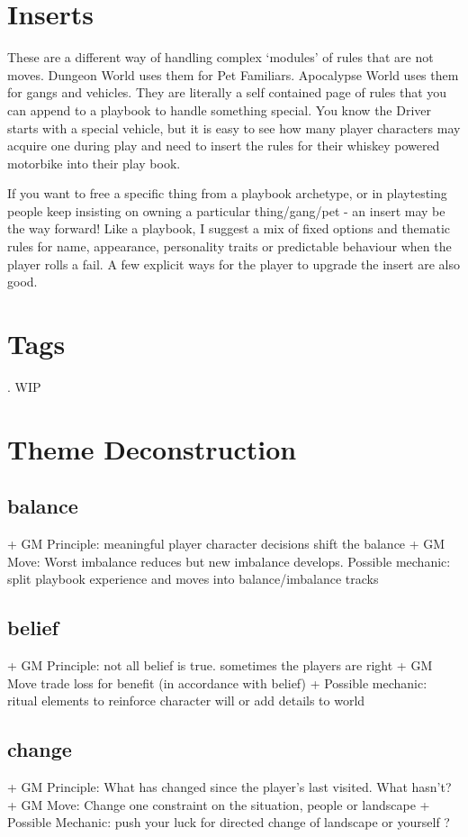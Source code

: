\documentclass{tufte-handout}
\begin{document}
\section{Inserts}
These are a different way of handling complex `modules' of rules that are not moves. Dungeon World uses them for Pet Familiars. Apocalypse World uses them for gangs and vehicles. They are literally a self contained page of rules that you can append to a playbook to handle something special. 
You know the Driver starts with a special vehicle, but it is easy to see how many player characters may acquire one during play and need to insert the rules for their whiskey powered motorbike into their play book.

If you want to free a specific thing from a playbook archetype, or in playtesting people keep insisting on owning a particular thing/gang/pet -  an insert may be the way forward! 
Like a playbook, I suggest a mix of fixed options and thematic rules for name, appearance, personality traits or predictable behaviour when the player rolls a fail. A few explicit ways for the player to upgrade the insert are also good. 


\section{Tags}.
WIP
\section{Theme Deconstruction}

\subsection{balance}
+ GM Principle: meaningful player character decisions shift the balance
+ GM Move: Worst imbalance reduces but new imbalance develops.	
Possible mechanic: split playbook experience and moves into balance/imbalance tracks

\subsection{belief}
+ GM Principle: not all belief is true. sometimes the players are right
+ GM Move trade loss for benefit (in accordance with belief)
+ Possible mechanic: ritual elements to reinforce character will or add details to world

\subsection{change}
+ GM Principle: What has changed since the player's last visited. What hasn't?	
+ GM Move: Change one constraint on the situation, people or landscape
+ Possible Mechanic: push your luck for directed change of landscape or yourself ?
\end{document}
